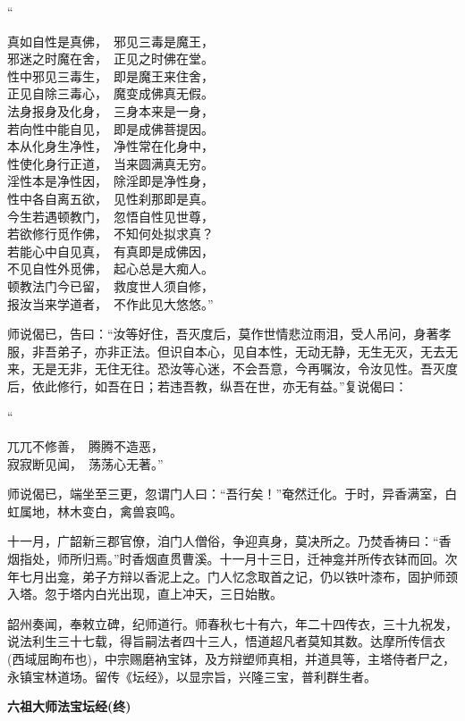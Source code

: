 \documentclass[UTF8, 11pt, oneside]{ctexart}
\newenvironment{jizi}[1]{
    \vspace{-1em}\begin{center}
        #1%
        \begin{varwidth}[t]{\linewidth}
}{
        \end{varwidth}
    \end{center}
}
\begin{document}
\begin{jizi}{“}
    真如自性是真佛，　邪见三毒是魔王， \\
    邪迷之时魔在舍，　正见之时佛在堂。 \\
    性中邪见三毒生，　即是魔王来住舍， \\
    正见自除三毒心，　魔变成佛真无假。 \\
    法身报身及化身，　三身本来是一身， \\
    若向性中能自见，　即是成佛菩提因。 \\
    本从化身生净性，　净性常在化身中， \\
    性使化身行正道，　当来圆满真无穷。 \\
    淫性本是净性因，　除淫即是净性身， \\
    性中各自离五欲，　见性刹那即是真。 \\
    今生若遇顿教门，　忽悟自性见世尊， \\
    若欲修行觅作佛，　不知何处拟求真？ \\
    若能心中自见真，　有真即是成佛因， \\
    不见自性外觅佛，　起心总是大痴人。 \\
    顿教法门今已留，　救度世人须自修， \\
    报汝当来学道者，　不作此见大悠悠。”
\end{jizi}

师说偈已，告曰：“汝等好住，吾灭度后，莫作世情悲泣雨泪，受人吊问，身著孝服，非吾弟子，亦非正法。但识自本心，见自本性，无动无静，无生无灭，无去无来，无是无非，无住无往。恐汝等心迷，不会吾意，今再嘱汝，令汝见性。吾灭度后，依此修行，如吾在日；若违吾教，纵吾在世，亦无有益。”复说偈曰：

\begin{jizi}{“}
    兀兀不修善，　腾腾不造恶， \\
    寂寂断见闻，　荡荡心无著。”
\end{jizi}

师说偈已，端坐至三更，忽谓门人曰：“吾行矣！”奄然迁化。于时，异香满室，白虹属地，林木变白，禽兽哀鸣。

十一月，广韶新三郡官僚，洎门人僧俗，争迎真身，莫决所之。乃焚香祷曰：“香烟指处，师所归焉。”时香烟直贯曹溪。十一月十三日，迁神龛并所传衣钵而回。次年七月出龛，弟子方辩以香泥上之。门人忆念取首之记，仍以铁叶漆布，固护师颈入塔。忽于塔内白光出现，直上冲天，三日始散。

韶州奏闻，奉敕立碑，纪师道行。师春秋七十有六，年二十四传衣，三十九祝发，说法利生三十七载，得旨嗣法者四十三人，悟道超凡者莫知其数。达摩所传信衣(西域屈眴布也)，中宗赐磨衲宝钵，及方辩塑师真相，并道具等，主塔侍者尸之，永镇宝林道场。留传《坛经》，以显宗旨，兴隆三宝，普利群生者。

\textbf{六祖大师法宝坛经(终)}
\end{document}
